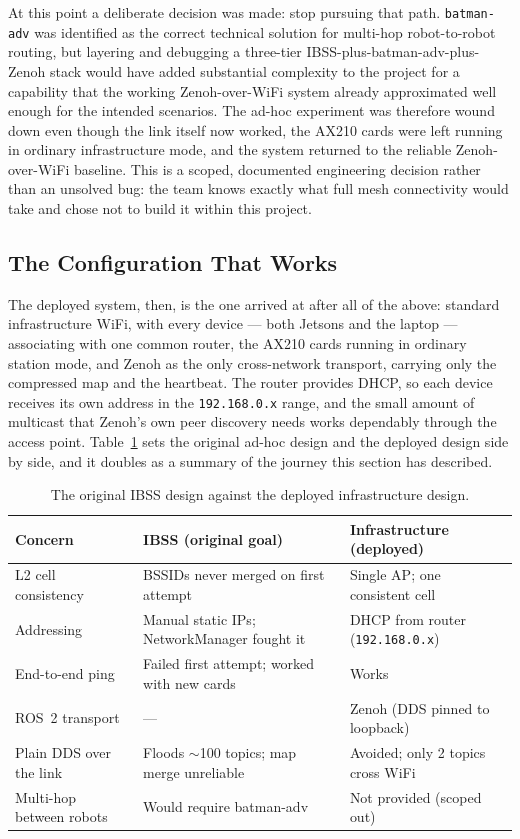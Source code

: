 At this point a deliberate decision was made: stop pursuing that path. \texttt{batman-adv} was identified as the correct technical solution for multi-hop robot-to-robot routing, but layering and debugging a three-tier IBSS-plus-batman-adv-plus-Zenoh stack would have added substantial complexity to the project for a capability that the working Zenoh-over-WiFi system already approximated well enough for the intended scenarios. The ad-hoc experiment was therefore wound down even though the link itself now worked, the AX210 cards were left running in ordinary infrastructure mode, and the system returned to the reliable Zenoh-over-WiFi baseline. This is a scoped, documented engineering decision rather than an unsolved bug: the team knows exactly what full mesh connectivity would take and chose not to build it within this project.

\subsection{The Configuration That Works}
\label{subsec:final_arch}

The deployed system, then, is the one arrived at after all of the above: standard infrastructure WiFi, with every device --- both Jetsons and the laptop --- associating with one common router, the AX210 cards running in ordinary station mode, and Zenoh as the only cross-network transport, carrying only the compressed map and the heartbeat. The router provides DHCP, so each device receives its own address in the \texttt{192.168.0.x} range, and the small amount of multicast that Zenoh's own peer discovery needs works dependably through the access point. Table~\ref{tab:ibss_vs_infra} sets the original ad-hoc design and the deployed design side by side, and it doubles as a summary of the journey this section has described.

\begin{table}[H]
    \centering
    \caption{The original IBSS design against the deployed infrastructure design.}
    \label{tab:ibss_vs_infra}
    \begin{tabularx}{\textwidth}{@{}l X X@{}}
        \toprule
        \textbf{Concern} & \textbf{IBSS (original goal)} & \textbf{Infrastructure (deployed)} \\
        \midrule
        L2 cell consistency & BSSIDs never merged on first attempt & Single AP; one consistent cell \\
        Addressing & Manual static IPs; NetworkManager fought it & DHCP from router (\texttt{192.168.0.x}) \\
        End-to-end ping & Failed first attempt; worked with new cards & Works \\
        ROS~2 transport & --- & Zenoh (DDS pinned to loopback) \\
        Plain DDS over the link & Floods $\sim$100 topics; map merge unreliable & Avoided; only 2 topics cross WiFi \\
        Multi-hop between robots & Would require batman-adv & Not provided (scoped out) \\
        \bottomrule
    \end{tabularx}
\end{table}

